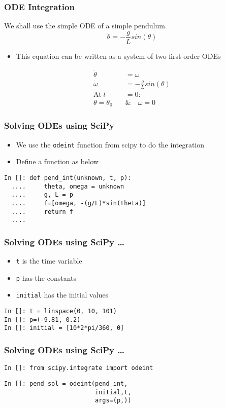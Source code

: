 \documentclass[14pt,compress]{beamer}
\newcounter{time}
\newcommand{\typ}[1]{\lstinline{#1}}
\begin{document}
\begin{frame}[fragile]
\frametitle{ODE Integration}
We shall use the simple ODE of a simple pendulum. 
\begin{equation*}
\ddot{\theta} = -\frac{g}{L}sin(\theta)
\end{equation*}
\begin{itemize}
\item This equation can be written as a system of two first order ODEs
\end{itemize}
\begin{align}
\dot{\theta} &= \omega \\
\dot{\omega} &= -\frac{g}{L}sin(\theta) \\
 \text{At}\ t &= 0 : \nonumber \\
 \theta = \theta_0\quad & \&\quad  \omega = 0 \nonumber
\end{align}
\end{frame}

\begin{frame}[fragile]
\frametitle{Solving ODEs using SciPy}
\begin{itemize}
\item We use the \typ{odeint} function from scipy to do the integration
\item Define a function as below
\end{itemize}
\begin{lstlisting}
In []: def pend_int(unknown, t, p):
  ....     theta, omega = unknown
  ....     g, L = p
  ....     f=[omega, -(g/L)*sin(theta)]
  ....     return f
  ....
\end{lstlisting}
\end{frame}

\begin{frame}[fragile]
\frametitle{Solving ODEs using SciPy \ldots}
\begin{itemize}
\item \typ{t} is the time variable \\ 
\item \typ{p} has the constants \\
\item \typ{initial} has the initial values
\end{itemize}
\begin{lstlisting}
In []: t = linspace(0, 10, 101)
In []: p=(-9.81, 0.2)
In []: initial = [10*2*pi/360, 0]
\end{lstlisting}
\end{frame}

\begin{frame}[fragile]
\frametitle{Solving ODEs using SciPy \ldots}

\small{\typ{In []: from scipy.integrate import odeint}}
\begin{lstlisting}
In []: pend_sol = odeint(pend_int, 
                         initial,t, 
                         args=(p,))
\end{lstlisting}
\end{frame}
\end{document}

